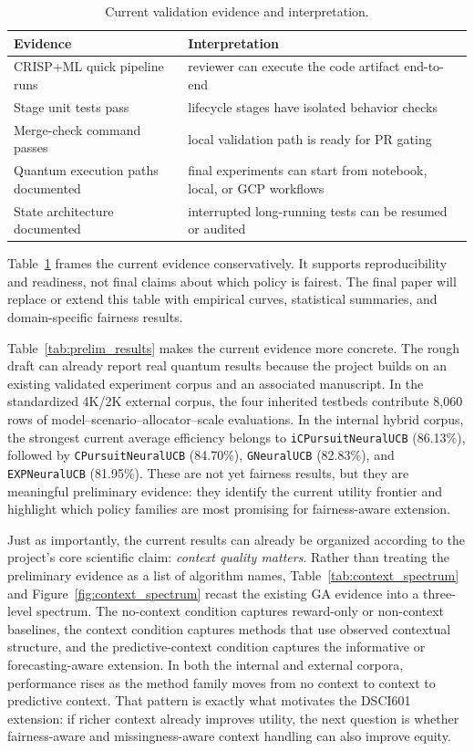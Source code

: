 \documentclass[conference]{IEEEtran}
\begin{document}
\begin{table}[t]
\caption{Current validation evidence and interpretation.}
\label{tab:validation}
\centering
\small
\begin{tabular}{p{}p{}}
\toprule
\textbf{Evidence} & \textbf{Interpretation} \\
\midrule
CRISP+ML quick pipeline runs & reviewer can execute the code artifact end-to-end \\
Stage unit tests pass & lifecycle stages have isolated behavior checks \\
Merge-check command passes & local validation path is ready for PR gating \\
Quantum execution paths documented & final experiments can start from notebook, local, or GCP workflows \\
State architecture documented & interrupted long-running tests can be resumed or audited \\
\bottomrule
\end{tabular}
\end{table}

Table~\ref{tab:validation} frames the current evidence conservatively. It
supports reproducibility and readiness, not final claims about which policy is
fairest. The final paper will replace or extend this table with empirical
curves, statistical summaries, and domain-specific fairness results.

Table~\ref{tab:prelim_results} makes the current evidence more concrete. The
rough draft can already report real quantum results because the project builds
on an existing validated experiment corpus and an associated manuscript. In the
standardized 4K/2K external corpus, the four inherited testbeds contribute
8,060 rows of model--scenario--allocator--scale evaluations. In the internal
hybrid corpus, the strongest current average efficiency belongs to
\texttt{iCPursuitNeuralUCB} (86.13\%), followed by
\texttt{CPursuitNeuralUCB} (84.70\%), \texttt{GNeuralUCB} (82.83\%), and
\texttt{EXPNeuralUCB} (81.95\%). These are not yet fairness results, but they
are meaningful preliminary evidence: they identify the current utility frontier
and highlight which policy families are most promising for fairness-aware
extension.

Just as importantly, the current results can already be organized according to
the project's core scientific claim: \emph{context quality matters}. Rather
than treating the preliminary evidence as a list of algorithm names,
Table~\ref{tab:context_spectrum} and Figure~\ref{fig:context_spectrum} recast
the existing GA evidence into a three-level spectrum. The no-context condition
captures reward-only or non-context baselines, the context condition captures
methods that use observed contextual structure, and the predictive-context
condition captures the informative or forecasting-aware extension. In both the
internal and external corpora, performance rises as the method family moves
from no context to context to predictive context. That pattern is exactly what
motivates the DSCI601 extension: if richer context already improves utility,
the next question is whether fairness-aware and missingness-aware context
handling can also improve equity.
\end{document}
